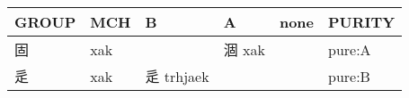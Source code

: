 \documentclass[14pt,a4paper]{scrartcl}
\begin{document}
\begin{longtable}[c]{@{}llllll@{}}
\toprule
\begin{minipage}[b]{0.14\columnwidth}\raggedright\strut
GROUP
\strut\end{minipage} &
\begin{minipage}[b]{0.14\columnwidth}\raggedright\strut
MCH
\strut\end{minipage} &
\begin{minipage}[b]{0.14\columnwidth}\raggedright\strut
B
\strut\end{minipage} &
\begin{minipage}[b]{0.14\columnwidth}\raggedright\strut
A
\strut\end{minipage} &
\begin{minipage}[b]{0.14\columnwidth}\raggedright\strut
none
\strut\end{minipage} &
\begin{minipage}[b]{0.14\columnwidth}\raggedright\strut
PURITY
\strut\end{minipage}\tabularnewline
\midrule
\endhead
\begin{minipage}[t]{0.14\columnwidth}\raggedright\strut
固
\strut\end{minipage} &
\begin{minipage}[t]{0.14\columnwidth}\raggedright\strut
xak
\strut\end{minipage} &
\begin{minipage}[t]{0.14\columnwidth}\raggedright\strut
\strut\end{minipage} &
\begin{minipage}[t]{0.14\columnwidth}\raggedright\strut
涸 xak
\strut\end{minipage} &
\begin{minipage}[t]{0.14\columnwidth}\raggedright\strut
\strut\end{minipage} &
\begin{minipage}[t]{0.14\columnwidth}\raggedright\strut
pure:A
\strut\end{minipage}\tabularnewline
\begin{minipage}[t]{0.14\columnwidth}\raggedright\strut
辵
\strut\end{minipage} &
\begin{minipage}[t]{0.14\columnwidth}\raggedright\strut
xak
\strut\end{minipage} &
\begin{minipage}[t]{0.14\columnwidth}\raggedright\strut
辵 trhjaek
\strut\end{minipage} &
\begin{minipage}[t]{0.14\columnwidth}\raggedright\strut
\strut\end{minipage} &
\begin{minipage}[t]{0.14\columnwidth}\raggedright\strut
\strut\end{minipage} &
\begin{minipage}[t]{0.14\columnwidth}\raggedright\strut
pure:B
\strut\end{minipage}\tabularnewline
\bottomrule
\end{longtable}
\end{document}

